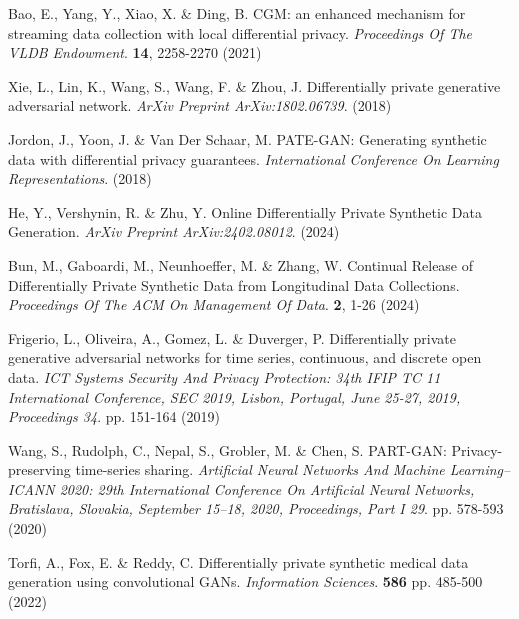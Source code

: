 \begin{thebibliography}{10}
\begin{small}
Bao, E., Yang, Y., Xiao, X. \& Ding, B. CGM: an enhanced mechanism for streaming data collection with local differential privacy. {\em Proceedings Of The VLDB Endowment}. \textbf{14}, 2258-2270 (2021)



Xie, L., Lin, K., Wang, S., Wang, F. \& Zhou, J. Differentially private generative adversarial network. {\em ArXiv Preprint ArXiv:1802.06739}. (2018)

Jordon, J., Yoon, J. \& Van Der Schaar, M. PATE-GAN: Generating synthetic data with differential privacy guarantees. {\em International Conference On Learning Representations}. (2018)


He, Y., Vershynin, R. \& Zhu, Y. Online Differentially Private Synthetic Data Generation. {\em ArXiv Preprint ArXiv:2402.08012}. (2024)

Bun, M., Gaboardi, M., Neunhoeffer, M. \& Zhang, W. Continual Release of Differentially Private Synthetic Data from Longitudinal Data Collections. {\em Proceedings Of The ACM On Management Of Data}. \textbf{2}, 1-26 (2024)

Frigerio, L., Oliveira, A., Gomez, L. \& Duverger, P. Differentially private generative adversarial networks for time series, continuous, and discrete open data. {\em ICT Systems Security And Privacy Protection: 34th IFIP TC 11 International Conference, SEC 2019, Lisbon, Portugal, June 25-27, 2019, Proceedings 34}. pp. 151-164 (2019)

Wang, S., Rudolph, C., Nepal, S., Grobler, M. \& Chen, S. PART-GAN: Privacy-preserving time-series sharing. {\em Artificial Neural Networks And Machine Learning–ICANN 2020: 29th International Conference On Artificial Neural Networks, Bratislava, Slovakia, September 15–18, 2020, Proceedings, Part I 29}. pp. 578-593 (2020)

Torfi, A., Fox, E. \& Reddy, C. Differentially private synthetic medical data generation using convolutional GANs. {\em Information Sciences}. \textbf{586} pp. 485-500 (2022)


\end{small}
\end{thebibliography}
